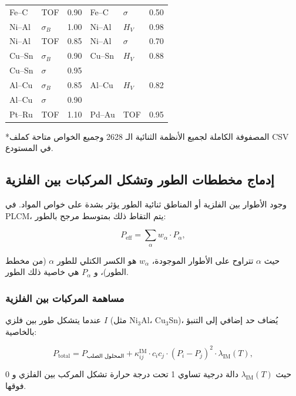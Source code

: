 \documentclass[11pt,a4paper]{article}
\begin{document}
\begin{otherlanguage}{arabic}
\begin{longtable}{p{1.5cm}p{1.5cm}p{1.2cm}p{1.2cm}p{1.2cm}p{1.2cm}}
			Fe–C  & TOF & 0.90 & Fe–C  & \(\sigma\) & 0.50 \\
			Ni–Al & \(\sigma_B\) & 1.00 & Ni–Al & \(H_V\) & 0.98 \\
			Ni–Al & TOF & 0.85 & Ni–Al & \(\sigma\) & 0.70 \\
			Cu–Sn & \(\sigma_B\) & 0.90 & Cu–Sn & \(H_V\) & 0.88 \\
			Cu–Sn & \(\sigma\) & 0.95 & & & \\
			Al–Cu & \(\sigma_B\) & 0.85 & Al–Cu & \(H_V\) & 0.82 \\
			Al–Cu & \(\sigma\) & 0.90 & & & \\
			Pt–Ru & TOF & 1.10 & Pd–Au & TOF & 0.95 \\
			\bottomrule
		\end{longtable}
		*المصفوفة الكاملة لجميع الأنظمة الثنائية الـ 2628 وجميع الخواص متاحة كملف CSV في المستودع.
		
		\subsection{إدماج مخططات الطور وتشكل المركبات بين الفلزية}
		\label{subsec:phase-diagrams}
		
		وجود الأطوار بين الفلزية أو المناطق ثنائية الطور يؤثر بشدة على خواص المواد. في PLCM، يتم التقاط ذلك بمتوسط مرجح بالطور:
		
		\begin{equation}
			P_{\text{eff}} = \sum_{\alpha} w_{\alpha} \cdot P_{\alpha},
			\label{eq:phase-weighted}
		\end{equation}
		
		حيث \(\alpha\) تتراوح على الأطوار الموجودة، \(w_{\alpha}\) هو الكسر الكتلي للطور \(\alpha\) (من مخطط الطور)، و \(P_{\alpha}\) هي خاصية ذلك الطور.
		
		\subsubsection{مساهمة المركبات بين الفلزية}
		عندما يتشكل طور بين فلزي \(I\) (مثل Ni\(_3\)Al، Cu\(_3\)Sn)، يُضاف حد إضافي إلى التنبؤ بالخاصية:
		
		\begin{equation}
			P_{\text{total}} = P_{\text{المحلول الصلب}} + \kappa_{ij}^{\text{IM}} \cdot c_i c_j \cdot (P_i - P_j)^2 \cdot \lambda_{\text{IM}}(T),
			\label{eq:intermetallic-term}
		\end{equation}
		
		حيث \(\lambda_{\text{IM}}(T)\) دالة درجية تساوي 1 تحت درجة حرارة تشكل المركب بين الفلزي و 0 فوقها.
		

\end{otherlanguage}
\end{document}
